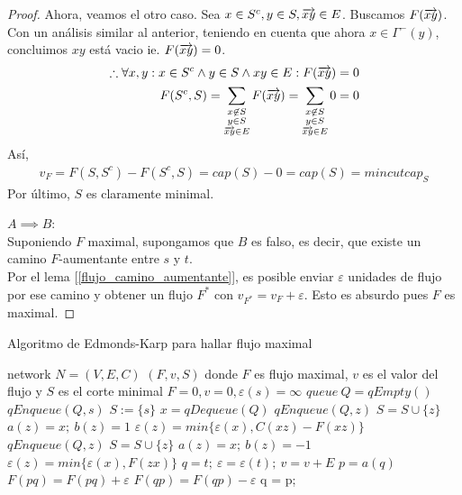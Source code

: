 \begin{proof}
  Ahora, veamos el otro caso. Sea $x \in S^c, y \in S, \overrightarrow{xy} \in E$. Buscamos $F(\overrightarrow{xy})$. Con un análisis similar al anterior, teniendo en cuenta que ahora $x\in \Gamma^-(y)$, concluimos $xy$ está vacio ie. $F(\overrightarrow{xy}) = 0$.
  \begin{align}
    \therefore \forall x, y : x \in S^c \wedge y \in S \wedge xy \in E : F(\overrightarrow{xy}) = 0\\
    F(S^c, S) = \sum_{\substack{x\not\in S\\ y \in S\\ \overrightarrow{xy} \in E}} F(\overrightarrow{xy}) = \sum_{\substack{x\not\in S\\ y \in S\\ \overrightarrow{xy} \in E}} 0 = 0
  \end{align}
  Así,
  \begin{align}
    v_F = F(S, S^c) - F(S^c, S) = cap(S) - 0 = cap(S) = mincutcap_S
  \end{align}
  Por último, $S$ es claramente minimal.
  
  $A \implies B$:\\
  Suponiendo $F$ maximal, supongamos que $B$ es falso, es decir, que existe un camino $F$-aumentante entre $s$ y $t$.\\
  Por el lema [\ref{flujo_camino_aumentante}], es posible enviar $\varepsilon$ unidades de flujo por ese camino y obtener un flujo $F^*$ con $v_{F^*} = v_F + \varepsilon$. Esto es absurdo pues $F$ es maximal.
\end{proof}

\begin{algorithm}
  \caption{Algoritmo de Edmonds-Karp para hallar flujo maximal}
  \begin{algorithmic}
    \Require network $N=(V,E,C)$
    \Ensure  $(F, v, S)$ donde $F$ es flujo maximal, $v$ es el valor del flujo y $S$ es el corte minimal
    \State $F = 0, v = 0, \varepsilon(s) = \infty$
    \State $queue\ Q = qEmpty()$
    \State $qEnqueue(Q,s)$
    \State $S := \{s\}$
    \State $x = qDequeue(Q)$
    \State {}
    \State $qEnqueue(Q,z)$
    \State $S = S \cup \{z\}$
    \State $a(z) = x;\ b(z) = 1$
    \State $\varepsilon(z) = min\{\varepsilon(x), C(xz) - F(xz)\}$
    \EndIf
    \EndFor
    \State {}
    \State $qEnqueue(Q,z)$
    \State $S = S \cup \{z\}$
    \State $a(z) = x;\ b(z) = -1$
    \State $\varepsilon(z) = min\{\varepsilon(x), F(zx)\}$
    \EndIf
    \EndFor
    \EndWhile
    \State
    \State $q = t;\ \varepsilon = \varepsilon(t);\ v = v+E$
    \State $p = a(q)$
    \State $F(pq) = F(pq) + \varepsilon$
    \State $F(qp) = F(qp) - \varepsilon$
    \EndIf
    \State q = p;
    \EndWhile
    \Else
    \State {}
    \EndIf
    \EndWhile
    \EndFunction
  \end{algorithmic}
\end{algorithm}

